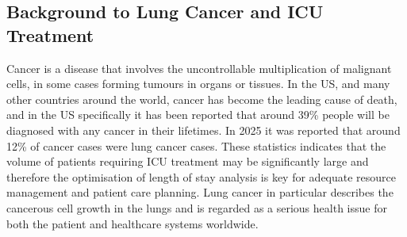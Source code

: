 \documentclass[11pt]{article}
\begin{document}

\subsection{Background to Lung Cancer and ICU Treatment}
Cancer is a disease that involves the uncontrollable multiplication of malignant cells, in some cases forming tumours in organs or tissues. In the US, and many other countries around the world, cancer has become the leading cause of death, and in the US specifically it has been reported that around 39\% people will be diagnosed with any cancer in their lifetimes\cite{cancerCancerSite}. In 2025 it was reported that around 12\% of cancer cases were lung cancer cases\cite{cancer}. These statistics indicates that the volume of patients requiring ICU treatment may be significantly large and therefore the optimisation of length of stay analysis is key for adequate resource management and patient care planning. Lung cancer in particular describes the cancerous cell growth in the lungs and is regarded as a serious health issue for both the patient and healthcare systems worldwide.
\end{document}
